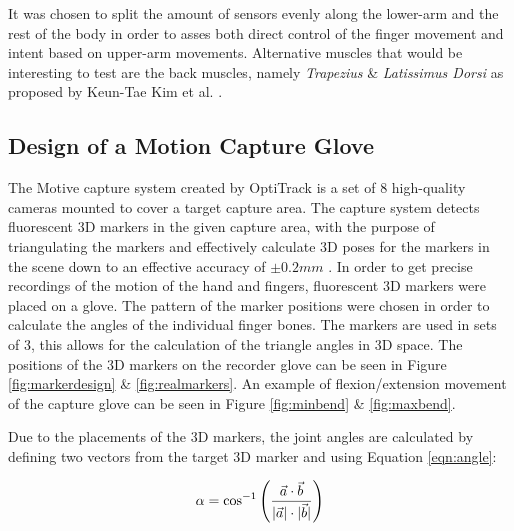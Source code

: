 \documentclass[../main.tex]{subfiles}
\begin{document}
It was chosen to split the amount of sensors evenly along the lower-arm and the rest of the body in order to asses both direct control of the finger movement and intent based on upper-arm movements.
Alternative muscles that would be interesting to test are the back muscles, namely \textit{Trapezius} \& \textit{Latissimus Dorsi} as proposed by Keun-Tae Kim et al. \cite{KeunTaeKim2021}.

\subsection{Design of a Motion Capture Glove}
\label{sec:motiveglove}

The Motive capture system created by OptiTrack \cite{motive} is a set of 8 high-quality cameras mounted to cover a target capture area.
The capture system detects fluorescent 3D markers in the given capture area, with the purpose of triangulating the markers and effectively calculate 3D poses for the markers in the scene down to an effective accuracy of $\pm 0.2mm$ .
In order to get precise recordings of the motion of the hand and fingers, fluorescent 3D markers were placed on a glove.
The pattern of the marker positions were chosen in order to calculate the angles of the individual finger bones.
The markers are used in sets of 3, this allows for the calculation of the triangle angles in 3D space.
The positions of the 3D markers on the recorder glove can be seen in Figure \ref{fig:markerdesign} \& \ref{fig:realmarkers}.
An example of \gls{flexion/extension} movement of the capture glove can be seen in Figure \ref{fig:minbend} \& \ref{fig:maxbend}.

Due to the placements of the 3D markers, the joint angles are calculated by defining two vectors from the target 3D marker and using Equation \eqref{eqn:angle}:

\begin{equation}
\label{eqn:angle}
\alpha = \cos^{-1}\left({\frac{\vec{a} \cdot \vec{b}}{ \lvert \vec{a} \rvert \cdot \lvert \vec{b} \rvert }}\right)
\end{equation}

\end{document}
